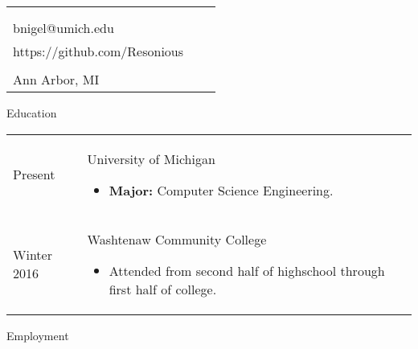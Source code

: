 \documentclass[12pt]{article}
\makeatletter
\def \address{2287 S. Main St.\\Ann Arbor, MI}
\def \author{Nigel Baillie}
\def \email{bnigel@umich.edu}
\def \phonenumber{(734) 678-5328}
\def \bday{Born April $11^{\text{th}}$ 1995}
\def \github{https://github.com/Resonious}
\renewcommand{\section}[1]{{\Huge{#1}}\vspace{2 mm}}
\newenvironment{timeline}
        {\begin{tabular}{p{21 mm}|p{150 mm}}}
        {\end{tabular}}
\newenvironment{timelinetitle}
        {\vspace{-2 mm}\begin{large}}
        {\end{large}\vspace{-1.5 mm}}
\newcommand{\timespan}[2]{{#2}\newline{#1}}
\makeatother
\begin{document}
\newlength{\rcollength}\setlength{\rcollength}{3.0in}%
\begin{tabular} {
  p{}
  p{}
  p{}
}
  \begin{flushleft}
    {\Huge{\author}}\\
    \vspace{1.5 mm}
  \end{flushleft}
  &
  \begin{center}
    {\phonenumber}\\
    {\email}\\
    {\github}
  \end{center}
  &
  \begin{flushright}
    {\bday}\\
    {\address}
  \end{flushright}
\end{tabular}

\section{Education}
\hline

\begin{timeline}
\timespan{Fall 2016}{Present}
&
\begin{timelinetitle}
    University of Michigan
\end{timelinetitle}
\begin{itemize}
  \item \textbf{Major:} Computer Science Engineering.
\end{itemize}

\\

\timespan{Fall 2012}{Winter 2016}
&
\begin{timelinetitle}
    Washtenaw Community College
\end{timelinetitle}
\begin{itemize}
  \item Attended from second half of highschool through first half of college.
\end{itemize}

\end{timeline}

\vspace{3.0 mm}
\section{Employment}
\hline
\end{document}
